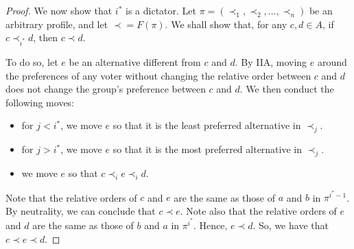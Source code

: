 \documentclass[10pt]{article}
\begin{document}
\begin{itemize}
\begin{proof}
				We now show that $i^*$ is a dictator. Let $\pi = (\prec_1, \prec_2, \dotsc, \prec_n)$
				be an arbitrary profile, and let $\prec = F(\pi).$ We shall show that,
				for any $c, d \in A$, if $c \prec_{i^*} d$, then $c \prec d$.
				
				To do so, let $e$ be an alternative different from $c$ and $d$.
				By IIA, moving $e$ around the preferences of any voter without
				changing the relative order between $c$ and $d$ does not change
				the group's preference between $c$ and $d$. We then conduct the
				following moves:
				
				\begin{itemize}
					\item for $j < i^*$, we move $e$ so that it is the least preferred alternative in
					$\prec_j$.
					\item for $j > i^*$, we move $e$ so that it is the most preferred alternative in
					$\prec_j$.
					\item we move $e$ so that $c \prec_i e \prec_i d$.
				\end{itemize}
				
				Note that the relative orders of $c$ and $e$ are the same as those
				of $a$ and $b$ in $\pi^{i^*-1}$. By neutrality, we can conclude that
				$c \prec e$. Note also that the relative orders of $e$ and $d$ are
				the same as those of $b$ and $a$ in $\pi^{i^*}$. Hence, $e \prec d$.
				So, we have that $c \prec e \prec d$.
			\end{proof}
			
		\end{itemize}
		
\end{document}
